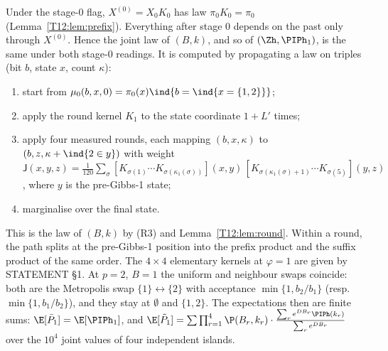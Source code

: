 \documentclass[11pt]{report}
\begin{document}
Under the stage-0 flag, $X^{(0)}=X_0K_0$ has law $\pi_0K_0=\pi_0$ (Lemma~\ref{T12:lem:prefix}). Everything after stage 0 depends on the past only through $X^{(0)}$. Hence the joint law of $(B,k)$, and so of $(\Zh,\PIPh_1)$, is the same under both stage-0 readings. It is computed by propagating a law on triples (bit $b$, state $x$, count $\kappa$):
\begin{enumerate}[label=(\arabic*)]
\item start from $\mu_0(b,x,0)=\pi_0(x)\ind\{b=\ind\{x=\{1,2\}\}\}$;
\item apply the round kernel $K_1$ to the state coordinate $1+L'$ times;
\item apply four measured rounds, each mapping $(b,x,\kappa)$ to $(b,z,\kappa+\ind\{2\in y\})$ with weight
$\mathsf J(x,y,z)=\frac1{120}\sum_\sigma[K_{\sigma(1)}\cdots K_{\sigma(\kappa_1(\sigma))}](x,y)\,[K_{\sigma(\kappa_1(\sigma)+1)}\cdots K_{\sigma(5)}](y,z)$,
where $y$ is the pre-Gibbs-1 state;
\item marginalise over the final state.
\end{enumerate}
This is the law of $(B,k)$ by (R3) and Lemma~\ref{T12:lem:round}. Within a round, the path splits at the pre-Gibbs-1 position into the prefix product and the suffix product of the same order. The $4\times4$ elementary kernels at $\varphi=1$ are given by STATEMENT \S1. At $p=2$, $B=1$ the uniform and neighbour swaps coincide: both are the Metropolis swap $\{1\}\leftrightarrow\{2\}$ with acceptance $\min\{1,b_2/b_1\}$ (resp.\ $\min\{1,b_1/b_2\}$), and they stay at $\emptyset$ and $\{1,2\}$. The expectations then are finite sums: $\E[\bar P_1]=\E[\PIPh_1]$, and
$\E[\tilde P_1]=\sum\prod_{r=1}^4\P(B_r,k_r)\cdot\frac{\sum_re^{DB_r}\PIPh(k_r)}{\sum_re^{DB_r}}$ over the $10^4$ joint values of four independent islands.
\end{document}
